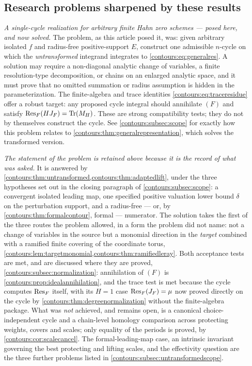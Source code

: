 \documentclass[11pt,letterpaper]{article}
\theoremstyle{definition}
\theoremstyle{remark}
\numberwithin{equation}{section}
\begin{document}
\subsection{Research problems sharpened by these results}
\label{contours:subsec:problems}
\emph{A single-cycle realization for arbitrary finite Hahn zero schemes ---
posed here, and now solved.} The problem, as this article posed it, was: given
arbitrary isolated $f$ and radius-free positive-support $E$, construct one
admissible $n$-cycle on which the \emph{untransformed} integrand integrates to
\eqref{contours:eq:generalres}. A solution may require a non-diagonal analytic change
of variables, a finite resolution-type decomposition, or chains on an enlarged
analytic space, and it must prove that no omitted summation or radius assumption is
hidden in the parameterization. The finite-algebra and trace identities
\eqref{contours:eq:traceresidue} offer a robust target: any proposed cycle integral
should annihilate $(F)$ and satisfy $\operatorname{Res}_F(HJ_F)=\operatorname{Tr}(M_H)$. These are strong
compatibility tests; they do not by themselves construct the cycle. See
\cref{contours:subsec:scope} for exactly how this problem relates to
\cref{contours:thm:generalrepresentation}, which solves the transformed version.

\emph{The statement of the problem is retained above because it is the record of
what was asked.} It is answered by
\cref{contours:thm:untransformed,contours:thm:adaptedlift}, under the three
hypotheses set out in the closing paragraph of \cref{contours:subsec:scope}: a
convergent isolated leading map, one specified positive valuation lower bound
$\delta$ on the perturbation support, and a radius-free --- or, by
\cref{contours:thm:formalcontour}, formal --- numerator. The solution takes the
first of the three routes the problem allowed, in a form the problem did not
name: not a change of variables in the source but a monomial direction in the
\emph{target} combined with a ramified finite covering of the coordinate torus,
\cref{contours:lem:targetmonomial,contours:thm:ramifiedleray}. Both acceptance
tests are met, and are discussed where they are proved,
\cref{contours:subsec:normalization}: annihilation of $(F)$ is
\cref{contours:prop:idealannihilation}, and the trace test is met because the
cycle computes $\operatorname{Res}_F$ itself, with its $H=1$ case
$\operatorname{Res}_F(J_F)=\mu$ now proved directly on the cycle by
\cref{contours:thm:degreenormalization} without the finite-algebra package. What
was \emph{not} achieved, and remains open, is a canonical choice-independent
cycle and a chain-level homology comparison across protecting weights, covers and
scales; only equality of the periods is proved, by
\cref{contours:cor:scalecancel}. The formal-leading-map case, an intrinsic
invariant governing the best protecting and lifting scales, and the effectivity
question are the three further problems listed in
\cref{contours:subsec:untransformedscope}.
\end{document}
